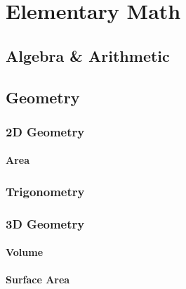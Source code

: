 \documentclass[../mathematics_cheat_sheet.tex]{subfiles}
\begin{document}
\part{Elementary Math}



\chapter{Algebra \& Arithmetic}

\chapter{Geometry}
\section{2D Geometry}
\subsection{Area}
\section{Trigonometry}
\section{3D Geometry}
\subsection{Volume}
\subsection{Surface Area}
\end{document}
